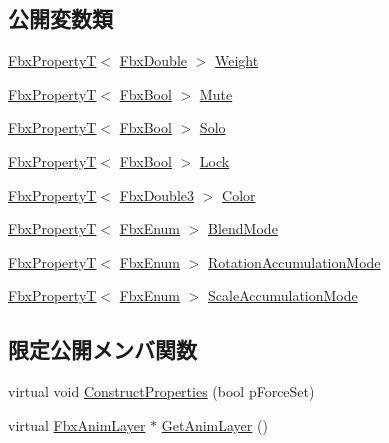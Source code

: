 \subsection*{公開変数類}
\begin{DoxyCompactItemize}
\item 
\hyperlink{class_fbx_property_t}{Fbx\+PropertyT}$<$ \hyperlink{fbxtypes_8h_a171e72a1c46fc15c1a6c9c31948c1c5b}{Fbx\+Double} $>$ \hyperlink{class_fbx_anim_layer_a6ab882a24bdf15c3448d064955bf0535}{Weight}
\item 
\hyperlink{class_fbx_property_t}{Fbx\+PropertyT}$<$ \hyperlink{fbxtypes_8h_a92e0562b2fe33e76a242f498b362262e}{Fbx\+Bool} $>$ \hyperlink{class_fbx_anim_layer_ae8f8f6db5f57e41d42935720b4e8d582}{Mute}
\item 
\hyperlink{class_fbx_property_t}{Fbx\+PropertyT}$<$ \hyperlink{fbxtypes_8h_a92e0562b2fe33e76a242f498b362262e}{Fbx\+Bool} $>$ \hyperlink{class_fbx_anim_layer_a0e002d0db3b5998a4c016cffb7f5c252}{Solo}
\item 
\hyperlink{class_fbx_property_t}{Fbx\+PropertyT}$<$ \hyperlink{fbxtypes_8h_a92e0562b2fe33e76a242f498b362262e}{Fbx\+Bool} $>$ \hyperlink{class_fbx_anim_layer_ade773868b910bcfcedf4818b96da9233}{Lock}
\item 
\hyperlink{class_fbx_property_t}{Fbx\+PropertyT}$<$ \hyperlink{fbxtypes_8h_ae0a96f14cde566774c7553aa7523b7a7}{Fbx\+Double3} $>$ \hyperlink{class_fbx_anim_layer_a9eb1d3e6e4bcfc59122fe6261eb529bc}{Color}
\item 
\hyperlink{class_fbx_property_t}{Fbx\+PropertyT}$<$ \hyperlink{fbxtypes_8h_a9a28614cb4272a0ad7d748eda7f3d3e5}{Fbx\+Enum} $>$ \hyperlink{class_fbx_anim_layer_a7e4d4d009aa2c248d19781e9d31f1f89}{Blend\+Mode}
\item 
\hyperlink{class_fbx_property_t}{Fbx\+PropertyT}$<$ \hyperlink{fbxtypes_8h_a9a28614cb4272a0ad7d748eda7f3d3e5}{Fbx\+Enum} $>$ \hyperlink{class_fbx_anim_layer_ae8d47b5fabab90773e9a40aeef934945}{Rotation\+Accumulation\+Mode}
\item 
\hyperlink{class_fbx_property_t}{Fbx\+PropertyT}$<$ \hyperlink{fbxtypes_8h_a9a28614cb4272a0ad7d748eda7f3d3e5}{Fbx\+Enum} $>$ \hyperlink{class_fbx_anim_layer_a50ec8bebaa1241cc168fae6bcf5c670f}{Scale\+Accumulation\+Mode}
\end{DoxyCompactItemize}
\subsection*{限定公開メンバ関数}
\begin{DoxyCompactItemize}
\item 
virtual void \hyperlink{class_fbx_anim_layer_a24afc26df98e56c965c0c60e637ed888}{Construct\+Properties} (bool p\+Force\+Set)
\item 
virtual \hyperlink{class_fbx_anim_layer}{Fbx\+Anim\+Layer} $\ast$ \hyperlink{class_fbx_anim_layer_ab031a979290c44d59ae3ba25a4ab2169}{Get\+Anim\+Layer} ()
\end{DoxyCompactItemize}
